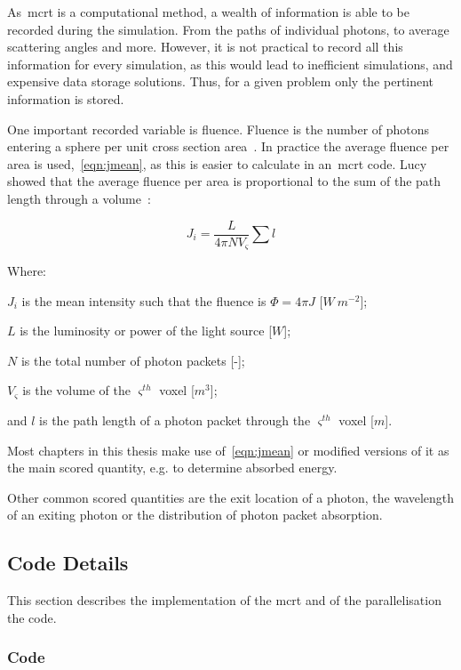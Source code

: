 As~\gls*{mcrt} is a computational method, a wealth of information is able to be recorded during the simulation.
From the paths of individual photons, to average scattering angles and more.
However, it is not practical to record all this information for every simulation, as this would lead to inefficient simulations, and expensive data storage solutions.
Thus, for a given problem only the pertinent information is stored.

One important recorded variable is fluence.
Fluence is the number of photons entering a sphere per unit cross section area~\cite{rogers1990monte}.
In practice the average fluence per area is used,~\cref{eqn:jmean}, as this is easier to calculate in an~\gls*{mcrt} code.
Lucy showed that the average fluence per area is proportional to the sum of the path length through a volume~\cite{lucy1999computing}:

\begin{equation}
J_i = \frac{L}{4\pi NV_{\varsigma}}\sum l 
\label{eqn:jmean}
\end{equation}

\noindent Where:

\indent $J_i$ is the mean intensity such that the fluence is $\Phi=4\pi J$ [$W\ m^{-2}$];

\indent $L$ is the luminosity or power of the light source [$W$];

\indent $N$ is the total number of photon packets [-];

\indent $V_{\varsigma}$ is the volume of the $\varsigma^{th}$ voxel [$m^3$];

\indent and $l$ is the path length of a photon packet through the $\varsigma^{th}$ voxel [$m$]. 

\medskip

Most chapters in this thesis make use of~\cref{eqn:jmean} or modified versions of it as the main scored quantity, e.g. to determine absorbed energy.

Other common scored quantities are the exit location of a photon, the wavelength of an exiting photon or the distribution of photon packet absorption.

\subsection{Code Details}

This section describes the implementation of the \gls*{mcrt} and of the parallelisation the code.

\subsubsection*{Code}

